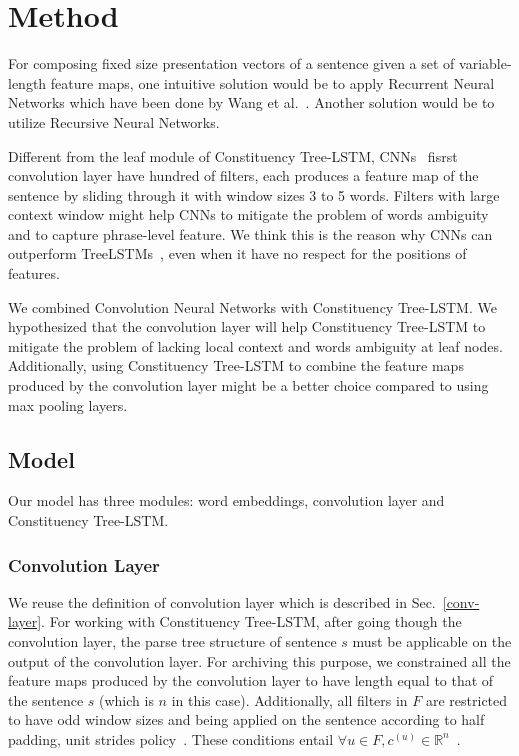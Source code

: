 \section{Method}
For composing fixed size presentation vectors of a sentence given a set of variable-length feature maps, one intuitive solution would be to apply Recurrent Neural Networks which have been done by Wang et al.~\cite{cnn-rnn}.
Another solution would be to utilize Recursive Neural Networks.

Different from the leaf module of Constituency Tree-LSTM, CNNs~\cite{KimCNN,DCNN,2-layer-cnn} fisrst convolution layer have hundred of filters, each produces a feature map of the sentence by sliding through it with window sizes 3 to 5 words.
Filters with large context window might help CNNs to mitigate the problem of words ambiguity and to capture phrase-level feature.
We think this is the reason why CNNs can outperform TreeLSTMs~\cite{KimCNN}, even when it have no respect for the positions of features. 

We combined Convolution Neural Networks with Constituency Tree-LSTM.
We hypothesized that the convolution layer will help Constituency Tree-LSTM to mitigate the problem of lacking local context and words ambiguity at leaf nodes.
Additionally, using Constituency Tree-LSTM to combine the feature maps produced by the convolution layer might be a better choice compared to using max pooling layers.
\subsection{Model}
Our model has three modules: word embeddings, convolution layer and Constituency Tree-LSTM.
\subsubsection{Convolution Layer}
We reuse the definition of convolution layer which is described in Sec.~\ref{conv-layer}.
For working with Constituency Tree-LSTM, after going though the convolution layer, the parse tree structure of sentence \(s\) must be applicable on the output of the convolution layer. 
For archiving this purpose, we constrained all the feature maps produced by the convolution layer to have length equal to that of the sentence \(s\) (which is \(n\) in this case).
Additionally, all filters in \(F\) are restricted to have odd window sizes and being applied on the sentence according to half padding, unit strides policy~\cite{conv-arith}.
These conditions entail \({\forall u \in F,  c^{(u)} \in \mathbb{R}^n}\)~\cite{conv-arith}.

